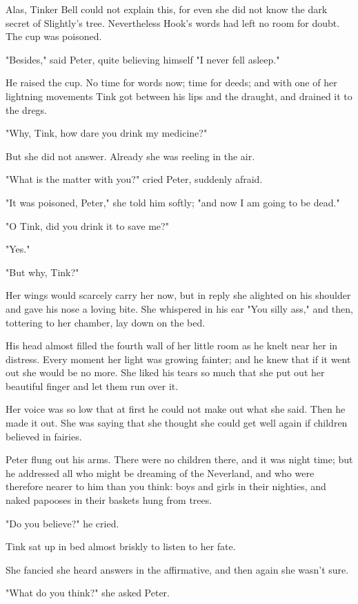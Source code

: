 Alas, Tinker Bell could not explain this, for even she did not know the
dark secret of Slightly's tree. Nevertheless Hook's words had left no room
for doubt. The cup was poisoned.


"Besides," said Peter, quite believing himself "I never fell asleep."


He raised the cup. No time for words now; time for deeds; and with one of
her lightning movements Tink got between his lips and the draught, and
drained it to the dregs.


"Why, Tink, how dare you drink my medicine?"


But she did not answer. Already she was reeling in the air.


"What is the matter with you?" cried Peter, suddenly afraid.


"It was poisoned, Peter," she told him softly; "and now I am going to be
dead."


"O Tink, did you drink it to save me?"


"Yes."


"But why, Tink?"


Her wings would scarcely carry her now, but in reply she alighted on his
shoulder and gave his nose a loving bite. She whispered in his ear "You
silly ass," and then, tottering to her chamber, lay down on the bed.


His head almost filled the fourth wall of her little room as he knelt near
her in distress. Every moment her light was growing fainter; and he knew
that if it went out she would be no more. She liked his tears so much that
she put out her beautiful finger and let them run over it.


Her voice was so low that at first he could not make out what she said.
Then he made it out. She was saying that she thought she could get well
again if children believed in fairies.


Peter flung out his arms. There were no children there, and it was night
time; but he addressed all who might be dreaming of the Neverland, and who
were therefore nearer to him than you think: boys and girls in their
nighties, and naked papooses in their baskets hung from trees.


"Do you believe?" he cried.


Tink sat up in bed almost briskly to listen to her fate.


She fancied she heard answers in the affirmative, and then again she
wasn't sure.


"What do you think?" she asked Peter.


